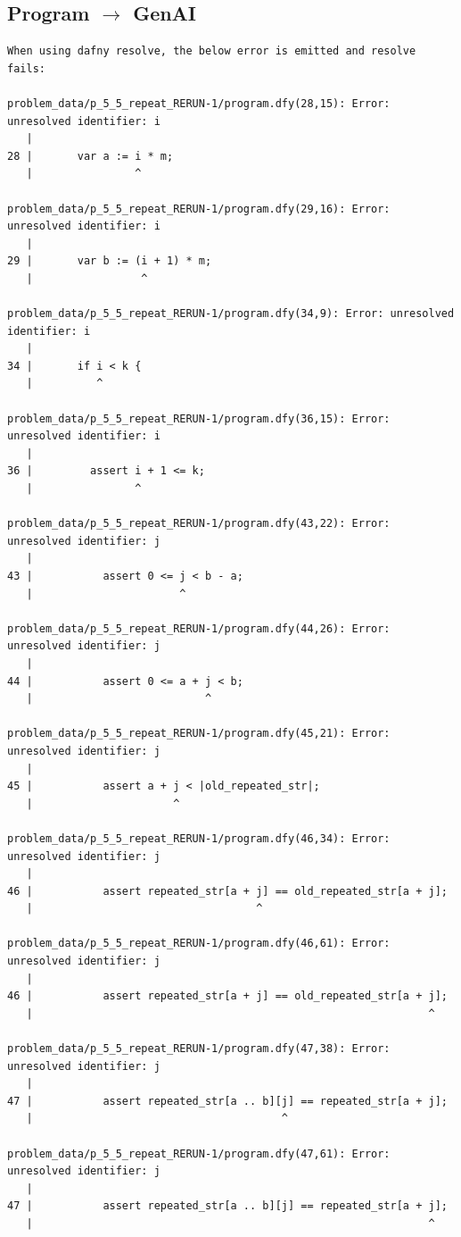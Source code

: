 \documentclass{article}
\begin{document}
\subsection*{Program $\rightarrow$ GenAI}
\begin{lstlisting}
When using dafny resolve, the below error is emitted and resolve fails:

problem_data/p_5_5_repeat_RERUN-1/program.dfy(28,15): Error: unresolved identifier: i
   |
28 |       var a := i * m;
   |                ^

problem_data/p_5_5_repeat_RERUN-1/program.dfy(29,16): Error: unresolved identifier: i
   |
29 |       var b := (i + 1) * m;
   |                 ^

problem_data/p_5_5_repeat_RERUN-1/program.dfy(34,9): Error: unresolved identifier: i
   |
34 |       if i < k {
   |          ^

problem_data/p_5_5_repeat_RERUN-1/program.dfy(36,15): Error: unresolved identifier: i
   |
36 |         assert i + 1 <= k;
   |                ^

problem_data/p_5_5_repeat_RERUN-1/program.dfy(43,22): Error: unresolved identifier: j
   |
43 |           assert 0 <= j < b - a;
   |                       ^

problem_data/p_5_5_repeat_RERUN-1/program.dfy(44,26): Error: unresolved identifier: j
   |
44 |           assert 0 <= a + j < b;
   |                           ^

problem_data/p_5_5_repeat_RERUN-1/program.dfy(45,21): Error: unresolved identifier: j
   |
45 |           assert a + j < |old_repeated_str|;
   |                      ^

problem_data/p_5_5_repeat_RERUN-1/program.dfy(46,34): Error: unresolved identifier: j
   |
46 |           assert repeated_str[a + j] == old_repeated_str[a + j];
   |                                   ^

problem_data/p_5_5_repeat_RERUN-1/program.dfy(46,61): Error: unresolved identifier: j
   |
46 |           assert repeated_str[a + j] == old_repeated_str[a + j];
   |                                                              ^

problem_data/p_5_5_repeat_RERUN-1/program.dfy(47,38): Error: unresolved identifier: j
   |
47 |           assert repeated_str[a .. b][j] == repeated_str[a + j];
   |                                       ^

problem_data/p_5_5_repeat_RERUN-1/program.dfy(47,61): Error: unresolved identifier: j
   |
47 |           assert repeated_str[a .. b][j] == repeated_str[a + j];
   |                                                              ^


\end{lstlisting}
\end{document}
